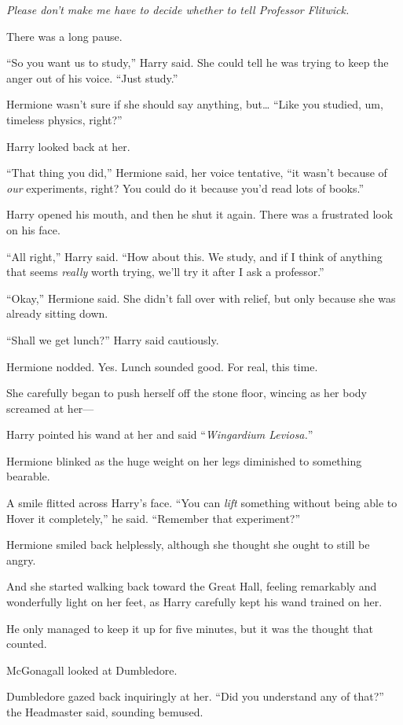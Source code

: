 \emph{Please don’t make me have to decide whether to tell Professor Flitwick.}

There was a long pause.

“So you want us to study,” Harry said. She could tell he was trying to keep the anger out of his voice. “Just study.”

Hermione wasn’t sure if she should say anything, but… “Like you studied, um, timeless physics, right?”

Harry looked back at her.

“That thing you did,” Hermione said, her voice tentative, “it wasn’t because of \emph{our} experiments, right? You could do it because you’d read lots of books.”

Harry opened his mouth, and then he shut it again. There was a frustrated look on his face.

“All right,” Harry said. “How about this. We study, and if I think of anything that seems \emph{really} worth trying, we’ll try it after I ask a professor.”

“Okay,” Hermione said. She didn’t fall over with relief, but only because she was already sitting down.

“Shall we get lunch?” Harry said cautiously.

Hermione nodded. Yes. Lunch sounded good. For real, this time.

She carefully began to push herself off the stone floor, wincing as her body screamed at her—

Harry pointed his wand at her and said “\emph{Wingardium Leviosa.}”

Hermione blinked as the huge weight on her legs diminished to something bearable.

A smile flitted across Harry’s face. “You can \emph{lift} something without being able to Hover it completely,” he said. “Remember that experiment?”

Hermione smiled back helplessly, although she thought she ought to still be angry.

And she started walking back toward the Great Hall, feeling remarkably and wonderfully light on her feet, as Harry carefully kept his wand trained on her.

He only managed to keep it up for five minutes, but it was the thought that counted.

\later

McGonagall looked at Dumbledore.

Dumbledore gazed back inquiringly at her. “Did you understand any of that?” the Headmaster said, sounding bemused.

